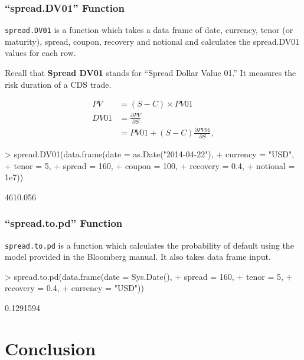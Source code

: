 \documentclass{jss}
\begin{document}
\subsubsection{``spread.DV01'' Function}

\texttt{spread.DV01} is a function which takes a data frame of date, currency, tenor (or maturity), spread, coupon, recovery and notional and calculates the spread.DV01 values for each row.

Recall that \textbf{Spread DV01} stands for ``Spread Dollar Value 01.'' It measures the risk duration of a CDS trade. 

\begin{align*}
  PV &= (S - C) \times PV01 \\
  DV01 &= \frac{\partial PV}{\partial S} \\
  &= PV01 + (S - C) \frac{\partial PV01}{\partial S},
\end{align*}

\begin{Schunk}
\begin{Sinput}
> spread.DV01(data.frame(date     = as.Date("2014-04-22"),
+                        currency = "USD",
+                        tenor    = 5,
+                        spread   = 160,
+                        coupon   = 100,
+                        recovery = 0.4,
+                        notional = 1e7))
\end{Sinput}
\begin{Soutput}
[1] 4610.056
\end{Soutput}
\end{Schunk}


\subsubsection{``spread.to.pd'' Function}

\texttt{spread.to.pd} is a function which calculates the probability of default using the model provided in the Bloomberg manual. It also takes data frame input.

\begin{Schunk}
\begin{Sinput}
> spread.to.pd(data.frame(date     = Sys.Date(),
+                         spread   = 160,
+                         tenor    = 5,
+                         recovery = 0.4,
+                         currency = "USD"))
\end{Sinput}
\begin{Soutput}
[1] 0.1291594
\end{Soutput}
\end{Schunk}

\section{Conclusion}

\newpage

\cite{barclays}
\cite{bloomberg}
\cite{openGamma}
\cite{glossary}
\cite{cdsOrigins}
\cite{blythe}
\cite{jk}
\cite{rates}
\cite{kane:david}
\cite{creditDerivatives}
\end{document}

